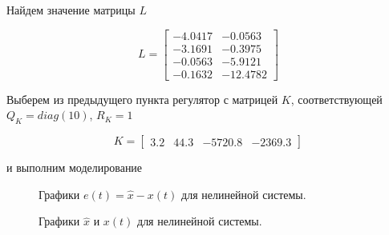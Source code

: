Найдем значение матрицы $L$

\begin{equation}
	L = \begin{bmatrix}
		    -4.0417 &  -0.0563\\
		 -3.1691 &  -0.3975\\
		 -0.0563 &  -5.9121\\
		 -0.1632 & -12.4782
	\end{bmatrix}
\end{equation}

Выберем из предыдущего пункта регулятор с матрицей $K$, соответствующей $Q_K=diag(10)$, $R_K=1$

 \begin{equation}
	K = \begin{bmatrix}
		3.2 &   44.3 &  -5720.8   &-2369.3
	\end{bmatrix}
\end{equation}

и выполним моделирование

\begin{figure}[!h]
	\caption{Графики $e(t) = \hat{x}-x(t)$ для нелинейной системы.}
	\label{6_kalm_e_1}
\end{figure}

\begin{figure}[!h]
	\caption{Графики $\hat{x}$ и $x(t)$ для нелинейной системы.}
	\label{6_kalm_x_1}
\end{figure}

